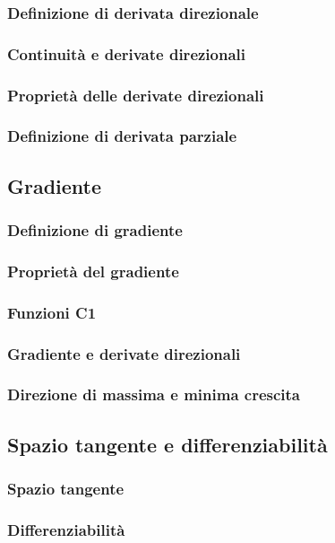\documentclass[a4paper]{article}
\begin{document}
\subsubsection*{Definizione di derivata direzionale}
\subsubsection*{Continuità e derivate direzionali}
\subsubsection*{Proprietà delle derivate direzionali}
\subsubsection*{Definizione di derivata parziale}

\subsection{Gradiente}
\subsubsection*{Definizione di gradiente}
\subsubsection*{Proprietà del gradiente} %
\subsubsection*{Funzioni C1}
\subsubsection*{Gradiente e derivate direzionali}
\subsubsection*{Direzione di massima e minima crescita}

\subsection{Spazio tangente e differenziabilità}
\subsubsection*{Spazio tangente}
\subsubsection*{Differenziabilità}
\end{document}
